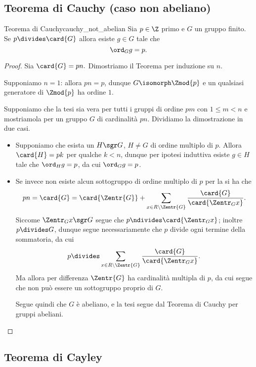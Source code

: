 \subsection{Teorema di Cauchy (caso non abeliano)}

\begin{theorem}
    {Teorema di Cauchy}{cauchy_not_abelian}
    Sia $p \in \Z$ primo e $G$ un gruppo finito. Se $p \divides \card{G}$ allora esiste $g \in G$ tale che \[
        \ord_G{g} = p.
    \]
\end{theorem}
\begin{proof}
    Sia $\card{G} = pn.$ Dimostriamo il Teorema per induzione su $n$.

     Supponiamo $n = 1$: allora $pn = p$, dunque $G \isomorph \Zmod{p}$ e un qualsiasi generatore di $\Zmod{p}$ ha ordine $1$.

     Supponiamo che la tesi sia vera per tutti i gruppi di ordine $pm$ con $1 \leq m < n$ e mostriamola per un gruppo $G$ di cardinalità $pn$. Dividiamo la dimostrazione in due casi.

    \begin{itemize}
        \item Supponiamo che esista un $H \sgr G$, $H \neq G$ di ordine multiplo di $p$. Allora $\card{H} = pk$ per qualche $k < n$, dunque per ipotesi induttiva esiste $g \in H$ tale che $\ord_H{g} = p$, da cui $\ord_G{g} = p$.
        \item Se invece non esiste alcun sottogruppo di ordine multiplo di $p$ per la  si ha che \[
            pn = \card{G} = \card{\Zentr{G}} + \sum_{x \in R\setminus \Zentr{G}} \frac{\card{G}}{\card{\Zentr_G{x}}}.
        \] Siccome $\Zentr_G{x} \sgr G$ segue che $p \ndivides \card{\Zentr_G{x}}$; inoltre $p \divides G$, dunque segue necessariamente che $p$ divide ogni termine della sommatoria, da cui \[
            p \divides \sum_{x \in R \setminus \Zentr{G}} \frac{\card{G}}{\card{\Zentr_G{x}}}.
        \] Ma allora per differenza $\Zentr{G}$ ha cardinalità multipla di $p$, da cui segue che non può essere un sottogruppo proprio di $G$.

        Segue quindi che $G$ è abeliano, e la tesi segue dal Teorema di Cauchy per gruppi abeliani. \qedhere
    \end{itemize}
\end{proof}

\subsection{Teorema di Cayley}

